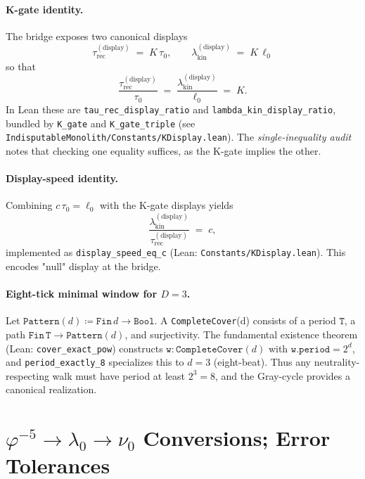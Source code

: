 \documentclass[12pt,a4paper]{article}
\begin{document}
\paragraph{K-gate identity.}
The bridge exposes two canonical displays
\[
  \tau_{\mathrm{rec}}^{(\mathrm{display})} \;=\; K\,\tau_0,
  \qquad
  \lambda_{\mathrm{kin}}^{(\mathrm{display})} \;=\; K\,\ell_0
\]
so that
\begin{equation}
  \frac{\tau_{\mathrm{rec}}^{(\mathrm{display})}}{\tau_0}
  \;=\;
  \frac{\lambda_{\mathrm{kin}}^{(\mathrm{display})}}{\ell_0}
  \;=\; K.
\end{equation}
In Lean these are \texttt{tau\_rec\_display\_ratio} and \texttt{lambda\_kin\_display\_ratio}, bundled by \texttt{K\_gate} and \texttt{K\_gate\_triple} (see \texttt{IndisputableMonolith/Constants/KDisplay.lean}). The \emph{single-inequality audit} notes that checking one equality suffices, as the K-gate implies the other.

\paragraph{Display-speed identity.}
Combining \(c\,\tau_0=\ell_0\) with the K-gate displays yields
\begin{equation}
  \frac{\lambda_{\mathrm{kin}}^{(\mathrm{display})}}
       {\tau_{\mathrm{rec}}^{(\mathrm{display})}}
  \;=\; c,
\end{equation}
implemented as \texttt{display\_speed\_eq\_c} (Lean: \texttt{Constants/KDisplay.lean}). This encodes "null" display at the bridge.

\paragraph{Eight-tick minimal window for \(D=3\).}
Let \(\texttt{Pattern}(d)\coloneqq \texttt{Fin}\,d\to\texttt{Bool}\). A \texttt{CompleteCover}(d) consists of a period \(\texttt{T}\), a path \(\texttt{Fin}\,\texttt{T}\to\texttt{Pattern}(d)\), and surjectivity. The fundamental existence theorem (Lean: \texttt{cover\_exact\_pow}) constructs \(\texttt{w}:\texttt{CompleteCover}(d)\) with \(\texttt{w.period}=2^d\), and \texttt{period\_exactly\_8} specializes this to \(d=3\) (eight-beat). Thus any neutrality-respecting walk must have period at least \(2^3=8\), and the Gray-cycle provides a canonical realization.

\section{\texorpdfstring{\(\varphi^{-5}\to \lambda_0 \to \nu_0\)}{phi^-5 -> lambda0 -> nu0} Conversions; Error Tolerances}
\label{app:phi-lambda-nu}
\end{document}
